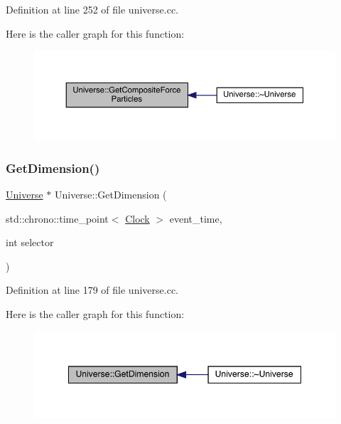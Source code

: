 Definition at line 252 of file universe.\+cc.

Here is the caller graph for this function\+:
\nopagebreak
\begin{figure}[H]
\begin{center}
\leavevmode
\includegraphics[width=350pt]{class_universe_aed37d7224b4e31bdfb0632e39bf19694_icgraph}
\end{center}
\end{figure}
\mbox{\label{class_universe_ab79a380dee684c6dc304b571f4d28645}} 
\subsubsection{\texorpdfstring{Get\+Dimension()}{GetDimension()}}
{\footnotesize\ttfamily \hyperlink{class_universe}{Universe} $\ast$ Universe\+::\+Get\+Dimension (\begin{DoxyParamCaption}\item[{std\+::chrono\+::time\+\_\+point$<$ \hyperlink{universe_8h_a0ef8d951d1ca5ab3cfaf7ab4c7a6fd80}{Clock} $>$}]{event\+\_\+time,  }\item[{int}]{selector }\end{DoxyParamCaption})}



Definition at line 179 of file universe.\+cc.

Here is the caller graph for this function\+:
\nopagebreak
\begin{figure}[H]
\begin{center}
\leavevmode
\includegraphics[width=348pt]{class_universe_ab79a380dee684c6dc304b571f4d28645_icgraph}
\end{center}
\end{figure}
\mbox{\label{class_universe_a1869fc7bf43827378bab5a701f7f917a}} 
